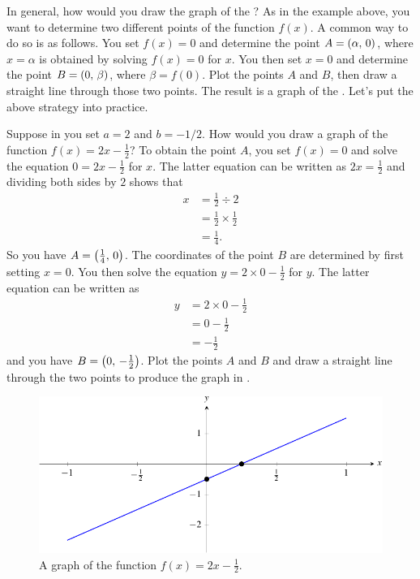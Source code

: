 \documentclass[a4paper,oneside,12pt]{article}
\begin{document}
In general, how would you draw the graph of the
?  As in the example above, you
want to determine two different points of the function $f(x)$.  A
common way to do so is as follows.  You set $f(x) = 0$ and determine
the point $A = \left\lparen{\alpha},\, {0}\right\rparen$, where $x = \alpha$ is obtained by
solving $f(x) = 0$ for $x$.  You then set $x = 0$ and determine the
point $B = \left\lparen{0},\, {\beta}\right\rparen$, where $\beta = f(0)$.  Plot the points
$A$ and $B$, then draw a straight line through those two points.  The
result is a graph of the .
Let's put the above strategy into practice.

Suppose in  you set $a = 2$ and
$b = -1 / 2$.  How would you draw a graph of the function
$f(x) = 2x - \frac{1}{2}$?  To obtain the point $A$, you set
$f(x) = 0$ and solve the equation $0 = 2x - \frac{1}{2}$ for $x$.  The
latter equation can be written as $2x = \frac{1}{2}$ and dividing both
sides by $2$ shows that
\begin{align*}
x
&=
\frac{1}{2} \div 2 \\[4pt]
&=
\frac{1}{2} \times \frac{1}{2} \\[4pt]
&=
\frac{1}{4}.
\end{align*}
So you have $A = \left\lparen{\frac{1}{4}},\, {0}\right\rparen$.  The coordinates of the
point $B$ are determined by first setting $x = 0$.  You then solve the
equation $y = 2 \times 0 - \frac{1}{2}$ for $y$.  The latter equation
can be written as
\begin{align*}
y
&=
2 \times 0 - \frac{1}{2} \\[4pt]
&=
0 - \frac{1}{2} \\[4pt]
&=
-\frac{1}{2}
\end{align*}
and you have $B = \left\lparen{0},\, {-\frac{1}{2}}\right\rparen$.  Plot the points $A$ and
$B$ and draw a straight line through the two points to produce the
graph in .

\begin{figure}[!htbp]
\centering
\includegraphics[scale=1]{image/06/a-2-b-minus-half.pdf}
\caption{%
  A graph of the function $f(x) = 2x - \frac{1}{2}$.
}
\label{fig:plot_2x_minus_half}
\end{figure}
\end{document}
